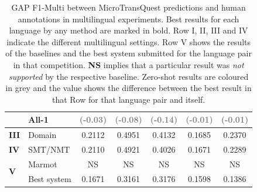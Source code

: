 \begin{table}[t]
\begin{center}
{\begin{tabular}{l l c c c c c}
				& All-1 & \textcolor{gray}{(-0.03)}  & \textcolor{gray}{(-0.08)} &  \textcolor{gray}{(-0.14)} & \textcolor{gray}{(-0.01)} & \textcolor{gray}{(-0.01)} \\
				\midrule
				\multirow{1}{*}{\bf III} & Domain & 0.2112  & 0.4951 &  0.4132 & 0.1685 & 0.2370  \\
				\midrule
				\multirow{1}{*}{\bf IV} & SMT/NMT & 0.2110  & 0.4921 &  0.4026 & 0.1671 & 0.2289 \\
				\midrule
				\multirow{2}{*}{\bf V} & Marmot & NS & NS & NS & NS & NS \\
				& Best system & 0.1671  & 0.3161 & 0.3176 & 0.1598 & 0.1386 \\
				\bottomrule
			\end{tabular}
		}
	\end{center}
	\caption[Multilingual GAP F1-Multi between MicroTransQuest predictions and human annotations]{GAP F1-Multi between MicroTransQuest predictions and human annotations in multilingual experiments. Best results for each language by any method are marked in bold. Row I, II, III and IV indicate the different multilingual settings. Row V shows the results of the baselines and the best system submitted for the language pair in that competition. \textbf{NS} implies that a particular result was \textit{not supported} by the respective baseline. Zero-shot results are coloured in grey and the value shows the difference between the best result in that Row for that language pair and itself.} 
	\label{tab:multilingual_gap_prediction}
\end{table}



